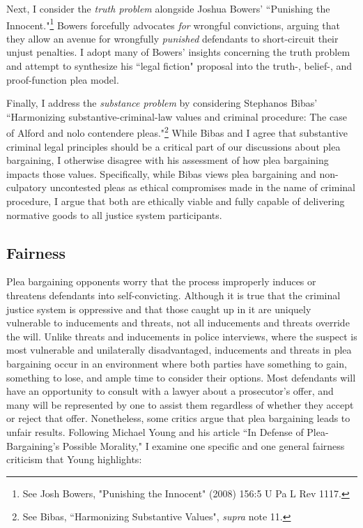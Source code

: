 Next, I consider the \textit{truth problem} alongside Joshua Bowers' ``Punishing the Innocent."\footnote{See Josh Bowers, "Punishing the Innocent" (2008) 156:5 U Pa L Rev 1117.} Bowers forcefully advocates \textit{for} wrongful convictions, arguing that they allow an avenue for wrongfully \textit{punished} defendants to short-circuit their unjust penalties. I adopt many of Bowers' insights concerning the truth problem and attempt to synthesize his ``legal fiction" proposal into the truth-, belief-, and proof-function plea model. 

Finally, I address the \textit{substance problem} by considering Stephanos Bibas' ``Harmonizing substantive-criminal-law values and criminal procedure: The case of Alford and nolo contendere pleas."\footnote{See Bibas, ``Harmonizing Substantive Values", \textit{supra} note 11.} While Bibas and I agree that substantive criminal legal principles should be a critical part of our discussions about plea bargaining, I otherwise disagree with his assessment of how plea bargaining impacts those values. Specifically, while Bibas views plea bargaining and non-culpatory uncontested pleas as ethical compromises made in the name of criminal procedure, I argue that both are ethically viable and fully capable of delivering normative goods to all justice system participants.

\subsection{Fairness}

Plea bargaining opponents worry that the process improperly induces or threatens defendants into self-convicting. Although it is true that the criminal justice system is oppressive and that those caught up in it are uniquely vulnerable to inducements and threats, not all inducements and threats override the will. Unlike threats and inducements in police interviews, where the suspect is most vulnerable and unilaterally disadvantaged, inducements and threats in plea bargaining occur in an environment where both parties have something to gain, something to lose, and ample time to consider their options. Most defendants will have an opportunity to consult with a lawyer about a prosecutor's offer, and many will be represented by one to assist them regardless of whether they accept or reject that offer. Nonetheless, some critics argue that plea bargaining leads to unfair results. Following Michael Young and his article ``In Defense of Plea-Bargaining's Possible Morality," I examine one specific and one general fairness criticism that Young highlights:

